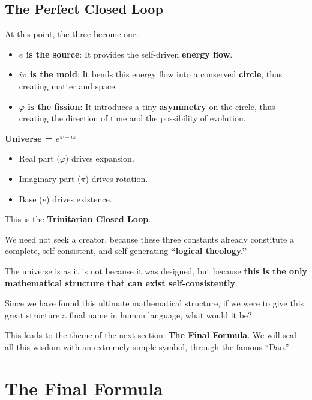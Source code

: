 \documentclass[11pt,a4paper,twoside]{book}
\begin{document}
\subsection{The Perfect Closed Loop}

At this point, the three become one.

\begin{itemize}
\item \textbf{$e$ is the source}: It provides the self-driven \textbf{energy flow}.

\item \textbf{$i\pi$ is the mold}: It bends this energy flow into a conserved \textbf{circle}, thus creating matter and space.

\item \textbf{$\varphi$ is the fission}: It introduces a tiny \textbf{asymmetry} on the circle, thus creating the direction of time and the possibility of evolution.
\end{itemize}

\textbf{Universe = $e^{\varphi + i\pi}$}

\begin{itemize}
\item Real part ($\varphi$) drives expansion.

\item Imaginary part ($\pi$) drives rotation.

\item Base ($e$) drives existence.
\end{itemize}

This is the \textbf{Trinitarian Closed Loop}.

We need not seek a creator, because these three constants already constitute a complete, self-consistent, and self-generating \textbf{``logical theology.''}

The universe is as it is not because it was designed, but because \textbf{this is the only mathematical structure that can exist self-consistently}.

Since we have found this ultimate mathematical structure, if we were to give this great structure a final name in human language, what would it be?

This leads to the theme of the next section: \textbf{The Final Formula}. We will seal all this wisdom with an extremely simple symbol, through the famous ``Dao.''

 \section{The Final Formula}
\end{document}
